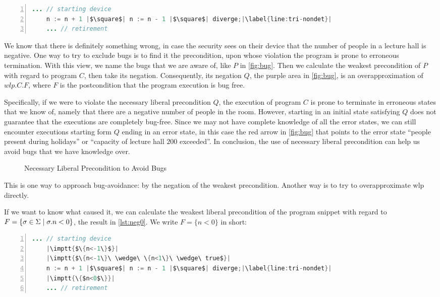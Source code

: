 \begin{lstlisting}[caption={Door with Sensors Counting Number of People Present}, label={lst:door}, language=java, numbers=left, stepnumber=1, captionpos=b,escapechar=|,frame=single]
	... // starting device
	n := n + 1 |$\square$| n := n - 1 |$\square$| diverge;|\label{line:tri-nondet}|
	... // retirement  
\end{lstlisting}

We know that there is definitely something wrong, in case the security sees on their device that the number of people in a lecture hall is negative. 
One way to try to exclude bugs is to find it the precondition, upon whose violation the program is prone to erroneous termination. 
With this view, we name the bugs that we are aware of, like $P$ in \autoref{fig:bug}. 
Then we calculate the weakest precondition of $P$ with regard to program $C$, then take its negation. 
Consequently, its negation $Q$, the purple area in \autoref{fig:bug}, is an overapproximation of $wlp.C.F$, where $F$ is the postcondition that the program execution is bug free. 

Specifically, if we were to violate the necessary liberal precondition $Q$, the execution of program $C$ is prone to terminate in erroneous states that we know of, namely that there are a negative number of people in the room. %
However, starting in an initial state satisfying $Q$ does not guarantee that the executions are completely bug-free. 
Since we may not have complete knowledge of all the error states, we can still encounter executions starting form $Q$ ending in an error state, in this case the red arrow in \autoref{fig:bug} that points to the error state ``people present during holidays'' or ``capacity of lecture hall $200$ exceeded''. 
In conclusion, the use of necessary liberal precondition can help us avoid bugs that we have knowledge over. 

\begin{figure}[t]
	\centering
	
	\caption{Necessary Liberal Precondition to Avoid Bugs}
	\label{fig:bug}
\end{figure}

This is one way to approach bug-avoidance: by the negation of the weakest precondition. 
Another way is to try to overapproximate wlp directly. 

If we want to know what caused it, we can calculate the weakest liberal precondition of the program snippet with regard to $F=\{\sigma\in\S\mid\sigma.n<0\}$, the result in \autoref{lst:neg0}. 
We write $F=\{n<0\}$ in short: 
\begin{lstlisting}[caption={Weakest (Liberal) Precondition w.r.t Postcondition $F=\{\sigma\in\S\mid\sigma.n<0\}$ }, label={lst:neg0}, language=java, numbers=left, stepnumber=1, captionpos=b,escapechar=|,frame=single]
	... // starting device
	|\imptt{$\{n<-1\}$}|
	|\imptt{$\{n<-1\}\ \wedge\ \{n<1\}\ \wedge\ true$}|
	n := n + 1 |$\square$| n := n - 1 |$\square$| diverge;|\label{line:tri-nondet}|
	|\imptt{\{$n<0$\}}|
	... // retirement   
\end{lstlisting}

